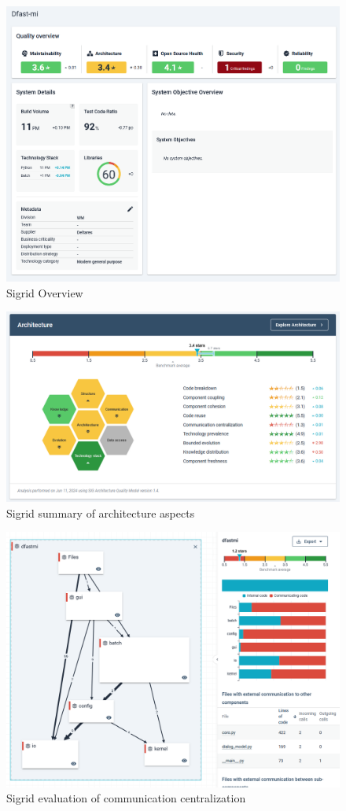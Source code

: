 \begin{figure}
\center
\includegraphics[width=\textwidth]{figures/sigrid.png}
\caption{Sigrid Overview}
\label{fig:sigrid_overview}
\end{figure}

\begin{figure}
\center
\includegraphics[width=\textwidth]{figures/sigrid-architecture.png}
\caption{Sigrid summary of architecture aspects}
\label{fig:sigrid_architecture_overview}
\end{figure}

\begin{figure}
\center
\includegraphics[width=\textwidth]{figures/sigrid-arch-communication.png}
\caption{Sigrid evaluation of communication centralization}
\label{fig:sigrid_architecture_comm}
\end{figure}
